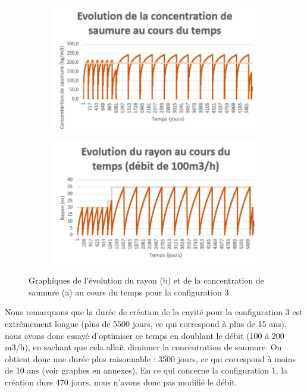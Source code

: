\documentclass[11pt,french,a4paper]{article}
\begin{document}
\begin{figure}[h]
  \centering
  \begin{subfigure}[b]{0.4\linewidth}
    \includegraphics[width=\linewidth]{image/chap2/Graphe concentration C3 100.png}
    \caption{ }
  \end{subfigure}
  \begin{subfigure}[b]{0.43\linewidth}
    \includegraphics[width=\linewidth]{image/chap2/Graphe rayon C3 100.png}
    \caption{ }
  \end{subfigure}
  \caption{Graphiques de l’évolution du rayon (b) et de la concentration de saumure (a) au cours du temps pour la configuration 3 }
\end{figure}

Nous remarquons que la durée de création de la cavité pour la configuration 3 est extrêmement longue (plus de 5500 jours, ce qui correspond à plus de 15 ans), nous avons donc essayé d’optimiser ce temps en doublant le débit (100 à 200 m3/h), en sachant que cela allait diminuer la concentration de saumure. On obtient donc une durée plus raisonnable : 3500 jours, ce qui correspond à moins de 10 ans (voir graphes en annexes). En ce qui concerne la configuration 1, la création dure 470 jours, nous n’avons donc pas modifié le débit. 
\end{document}
